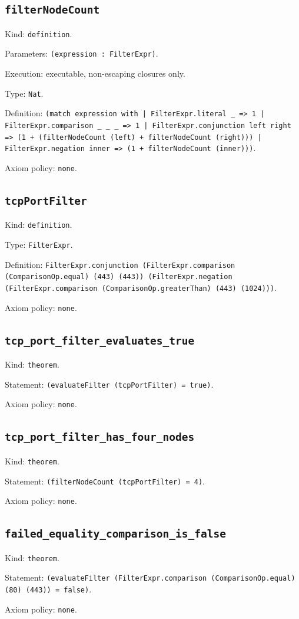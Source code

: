 \documentclass[11pt]{article}
\begin{document}
\subsection*{\texttt{filterNodeCount}}
\noindent Kind: \texttt{definition}.\par
\noindent Parameters: \texttt{(expression : FilterExpr)}.\par
\noindent Execution: executable, non-escaping closures only.\par
\noindent Type: \texttt{Nat}.\par
\noindent Definition: \texttt{(match expression with | FilterExpr.literal \_ => 1 | FilterExpr.comparison \_ \_ \_ => 1 | FilterExpr.conjunction left right => (1 + (filterNodeCount (left) + filterNodeCount (right))) | FilterExpr.negation inner => (1 + filterNodeCount (inner)))}.\par
\noindent Axiom policy: \texttt{none}.\par
\subsection*{\texttt{tcpPortFilter}}
\noindent Kind: \texttt{definition}.\par
\noindent Type: \texttt{FilterExpr}.\par
\noindent Definition: \texttt{FilterExpr.conjunction (FilterExpr.comparison (ComparisonOp.equal) (443) (443)) (FilterExpr.negation (FilterExpr.comparison (ComparisonOp.greaterThan) (443) (1024)))}.\par
\noindent Axiom policy: \texttt{none}.\par
\subsection*{\texttt{tcp\_port\_filter\_evaluates\_true}}
\noindent Kind: \texttt{theorem}.\par
\noindent Statement: \texttt{(evaluateFilter (tcpPortFilter) = true)}.\par
\noindent Axiom policy: \texttt{none}.\par
\subsection*{\texttt{tcp\_port\_filter\_has\_four\_nodes}}
\noindent Kind: \texttt{theorem}.\par
\noindent Statement: \texttt{(filterNodeCount (tcpPortFilter) = 4)}.\par
\noindent Axiom policy: \texttt{none}.\par
\subsection*{\texttt{failed\_equality\_comparison\_is\_false}}
\noindent Kind: \texttt{theorem}.\par
\noindent Statement: \texttt{(evaluateFilter (FilterExpr.comparison (ComparisonOp.equal) (80) (443)) = false)}.\par
\noindent Axiom policy: \texttt{none}.\par
\end{document}
